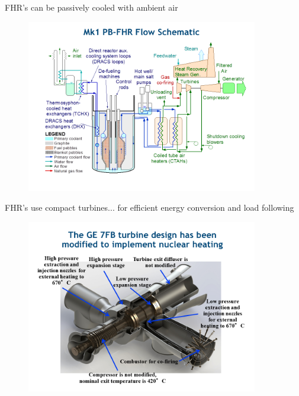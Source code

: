 \documentclass{beamer}
\begin{document}
    \begin{frame}{FHR's can be passively cooled with ambient air}
        \begin{figure}
            \centering
            \includegraphics[width=0.9\textwidth]{./img/fhrBop.png}
            \caption*{}
        \end{figure}
    \end{frame}

    \begin{frame}{FHR's use compact turbines}{... for efficient energy conversion and load following}
        \begin{figure}
            \centering
            \includegraphics[width=0.9\textwidth]{./img/fhrPower.png}
            \caption*{}
        \end{figure}
    \end{frame}
\end{document}
